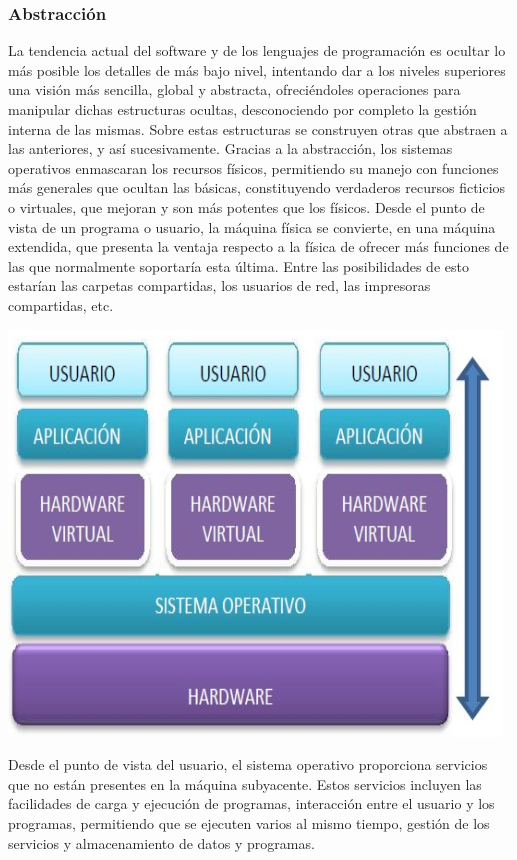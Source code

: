 \documentclass[11pt]{article}
\begin{document}
\subsubsection{Abstracción}
\label{sec:orga337d23}
La tendencia actual del software y de los lenguajes de programación es
ocultar lo más posible los detalles de más bajo nivel, intentando dar a
los niveles superiores una visión más sencilla, global y abstracta,
ofreciéndoles operaciones para manipular dichas estructuras ocultas,
desconociendo por completo la gestión interna de las mismas. Sobre estas
estructuras se construyen otras que abstraen a las anteriores, y así
sucesivamente. Gracias a la abstracción, los sistemas operativos
enmascaran los recursos físicos, permitiendo su manejo con funciones más
generales que ocultan las básicas, constituyendo verdaderos recursos
ficticios o virtuales, que mejoran y son más potentes que los físicos.
Desde el punto de vista de un programa o usuario, la máquina física se
convierte, en una máquina extendida, que presenta la ventaja respecto a
la física de ofrecer más funciones de las que normalmente soportaría
esta última. Entre las posibilidades de esto estarían las carpetas
compartidas, los usuarios de red, las impresoras compartidas, etc.

\begin{center}
\includegraphics[width=.9\linewidth]{ArquitecturaSistemaOperativo/SO_MaquinaExtendida.PNG}
\end{center}

Desde el punto de vista del usuario, el sistema operativo proporciona
servicios que no están presentes en la máquina subyacente. Estos
servicios incluyen las facilidades de carga y ejecución de programas,
interacción entre el usuario y los programas, permitiendo que se
ejecuten varios al mismo tiempo, gestión de los servicios y
almacenamiento de datos y programas.
\end{document}
